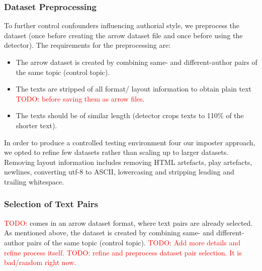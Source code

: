 \subsubsection{Dataset Preprocessing}
\label{subsubsec:dataset_preprocessing}

To further control confounders influencing authorial style, we preprocess the dataset 
(once before creating the arrow dataset file and once before using the detector).
The requirements for the preprocessing are:
\begin{itemize}
    \item The \dataBlog{} arrow dataset is created by combining same- and different-author pairs of the same topic (control topic).
    \item The texts are stripped of all format/ layout information to obtain plain text \textcolor{red}{TODO: before saving them as arrow files}.
    \item The texts should be of similar length (detector crops texts to 110\% of the shorter text).
\end{itemize}
In order to produce a controlled testing environment four our imposter approach, 
we opted to refine few datasets rather than scaling up to larger datasets.
Removing layout information includes removing HTML artefacts, play artefacts, newlines, 
converting utf-8 to ASCII, lowercasing and stripping leading and trailing whitespace.

\subsubsection{Selection of Text Pairs}
\label{subsubsec:dataset_text_pair_selection}

\textcolor{red}{TODO:} \dataPan{} comes in an arrow dataset format, where text pairs are already selected.
As mentioned above, the \dataBlog{} dataset is created by combining same- and different-author pairs of the same topic (control topic). 
\textcolor{red}{TODO: Add more details and refine process itself.}
\textcolor{red}{TODO: refine and preprocess \dataGutenberg{} dataset pair selection. It is bad/random right now.}